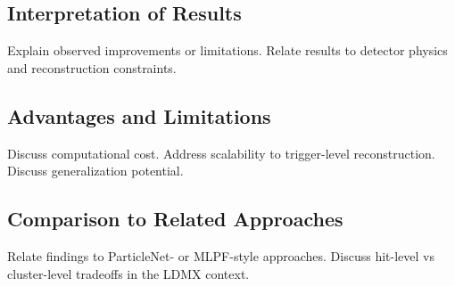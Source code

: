 
\subsection{Interpretation of Results}
Explain observed improvements or limitations.
Relate results to detector physics and reconstruction constraints.

\subsection{Advantages and Limitations}
Discuss computational cost.
Address scalability to trigger-level reconstruction.
Discuss generalization potential.

\subsection{Comparison to Related Approaches}
Relate findings to ParticleNet- or MLPF-style approaches.
Discuss hit-level vs cluster-level tradeoffs in the LDMX context.

